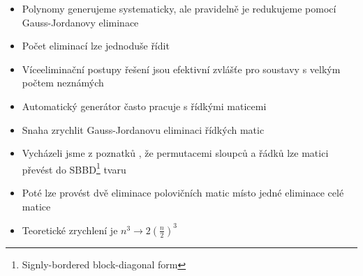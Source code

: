 \documentclass[cmpiitalkstyle, 25pt]{cmptalk}
\begin{document}
\begin{cmptalkslide}
  \begin{itemize}
    \item Polynomy generujeme systematicky, ale pravidelně je redukujeme pomocí Gauss-Jordanovy eliminace
    \item Počet eliminací lze jednoduše řídit
    \item Víceeliminační postupy řešení jsou efektivní zvlášťe pro soustavy s velkým počtem neznámých
  \end{itemize}
\end{cmptalkslide}

\begin{cmptalkslide}
  \begin{itemize}
    \item Automatický generátor často pracuje s řídkými maticemi
    \item Snaha zrychlit Gauss-Jordanovu eliminaci řídkých matic
    \item Vycházeli jsme z poznatků \cite{SBBD}, že permutacemi sloupců a řádků lze matici převést do SBBD\footnote{Signly-bordered block-diagonal form} tvaru
    \item Poté lze provést dvě eliminace polovičních matic místo jedné eliminace celé matice
    \item Teoretické zrychlení je $n^3 \rightarrow 2\left(\frac{n}{2}\right)^3$
  \end{itemize}

\end{cmptalkslide}
\end{document}
